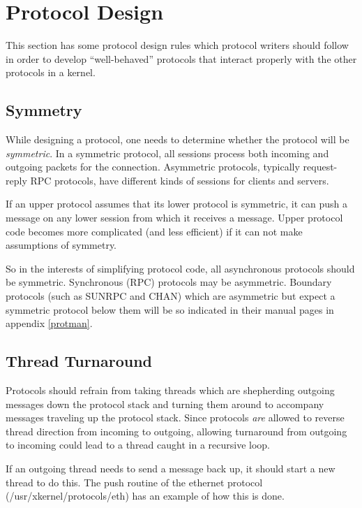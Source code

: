 % 
%
%

\section{Protocol Design}

This section has some protocol design rules which protocol writers
should follow in order to develop ``well-behaved'' protocols that
interact properly with the other protocols in a kernel.

\subsection{Symmetry}

While designing a protocol, one needs to determine whether the
protocol will be {\sl symmetric}.  In a symmetric protocol, all
sessions process both incoming and outgoing packets for the
connection.  Asymmetric protocols, typically request-reply RPC
protocols, have different kinds of sessions for clients and servers.

If an upper protocol assumes that its lower protocol is symmetric, it
can push a message on any lower session from which it receives a
message.  Upper protocol code becomes more complicated (and less
efficient) if it can not make assumptions of symmetry.  

So in the interests of simplifying protocol code, all asynchronous
protocols should be symmetric.  Synchronous (RPC) protocols may be
asymmetric.  Boundary protocols (such as SUNRPC and CHAN) which are
asymmetric but expect a symmetric protocol below them will be so
indicated in their manual pages in appendix \ref{protman}.


\subsection{Thread Turnaround}

Protocols should refrain from taking threads which are shepherding
outgoing messages down the protocol stack and turning them around to
accompany messages traveling up the protocol stack.  Since protocols
{\em are} allowed to reverse thread direction from incoming to outgoing,
allowing turnaround from outgoing to incoming could lead to a thread
caught in a recursive loop.

If an outgoing thread needs to send a message back up, it should start
a new thread to do this.  The push routine of the ethernet protocol
({\sanss /usr/xkernel/protocols/eth}) has an example of how this is done.





